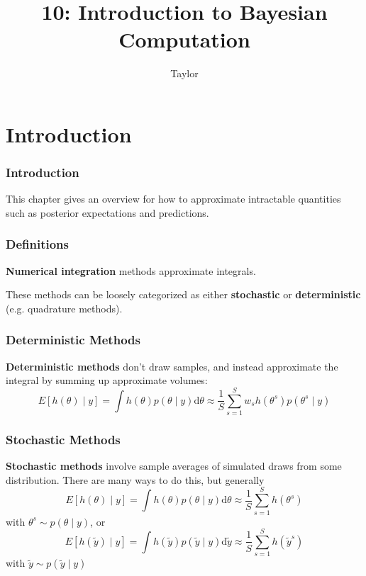 \documentclass{beamer}
\title["10"]{10: Introduction to Bayesian Computation}
\author{Taylor}
\institute[UVA] 
{
University of Virginia \\
\medskip
\textit{} 
}
\date{}
\begin{document}

\begin{frame}
\titlepage 
\end{frame}



\begin{frame}
\tableofcontents
\end{frame}

\section{Introduction}

\begin{frame}
\frametitle{Introduction}

This chapter gives an overview for how to approximate intractable quantities such as posterior expectations and predictions. 

\end{frame}

\begin{frame}
\frametitle{Definitions}

{\bf Numerical integration} methods approximate integrals. 
\newline

These methods can be loosely categorized as either {\bf stochastic} or {\bf deterministic} (e.g. quadrature methods).


\end{frame}




\begin{frame}
\frametitle{Deterministic Methods}

{\bf Deterministic methods} don't draw samples, and instead approximate the integral by summing up approximate volumes:
\[
E[h(\theta) \mid y] = \int h(\theta) p(\theta \mid y) \text{d}\theta \approx \frac{1}{S} \sum_{s=1}^S w_s h(\theta^s)p(\theta^s \mid y)
\]

\end{frame}

\begin{frame}
\frametitle{Stochastic Methods}

{\bf Stochastic methods} involve sample averages of simulated draws from some distribution. There are many ways to do this, but generally
\[
E[h(\theta) \mid y] = \int h(\theta) p(\theta \mid y) \text{d}\theta \approx \frac{1}{S} \sum_{s=1}^S h(\theta^s)
\]
with $\theta^s \sim p(\theta \mid y)$, or
\[
E[h(\tilde{y}) \mid y] = \int h(\tilde{y}) p(\tilde{y} \mid y) \text{d} \tilde{y} \approx \frac{1}{S} \sum_{s=1}^S h(\tilde{y}^s)
\]
with $\tilde{y} \sim p(\tilde{y} \mid y)$

\end{frame}
\end{document}
